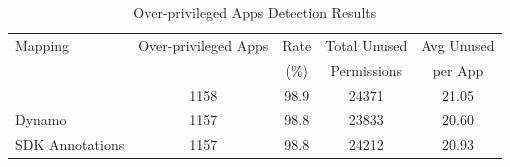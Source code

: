 
\begin{table}[htbp]
\centering
\caption{Over-privileged Apps Detection Results}
\label{tab:over_privileged_detection}
\begin{tabular}{lcccc}
\toprule
Mapping & Over-privileged Apps & Rate & Total Unused & Avg Unused \\
 & & (\%) & Permissions & per App \\
\midrule
\tool{} & 1158 & 98.9 & 24371 & 21.05 \\
Dynamo & 1157 & 98.8 & 23833 & 20.60 \\
SDK Annotations & 1157 & 98.8 & 24212 & 20.93 \\
\bottomrule
\end{tabular}
\end{table}